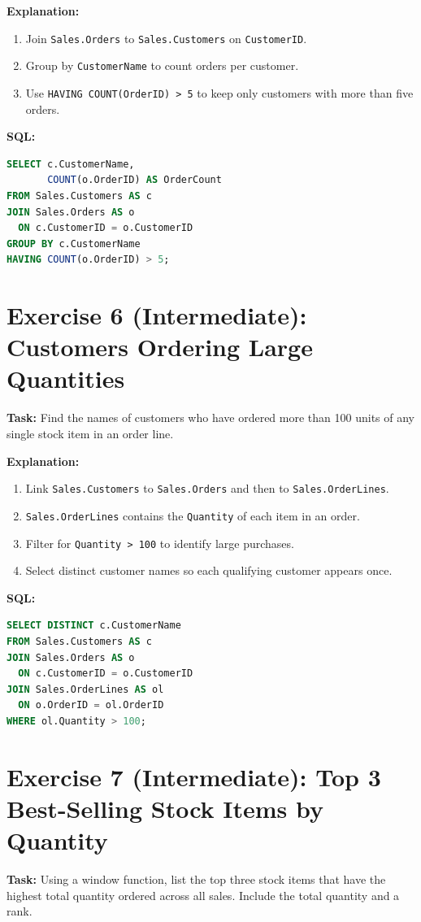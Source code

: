 \documentclass[12pt,a4paper]{article}
\begin{document}
\textbf{Explanation:}
\begin{enumerate}
  \item Join \texttt{Sales.Orders} to \texttt{Sales.Customers} on \texttt{CustomerID}.
  \item Group by \texttt{CustomerName} to count orders per customer.
  \item Use \texttt{HAVING COUNT(OrderID) > 5} to keep only customers with more than five orders.
\end{enumerate}

\textbf{SQL:}
\begin{lstlisting}[language=SQL]
SELECT c.CustomerName,
       COUNT(o.OrderID) AS OrderCount
FROM Sales.Customers AS c
JOIN Sales.Orders AS o
  ON c.CustomerID = o.CustomerID
GROUP BY c.CustomerName
HAVING COUNT(o.OrderID) > 5;
\end{lstlisting}

\section{Exercise 6 (Intermediate): Customers Ordering Large Quantities}
\textbf{Task:} Find the names of customers who have ordered more than 100 units of any single stock item in an order line.

\textbf{Explanation:}
\begin{enumerate}
  \item Link \texttt{Sales.Customers} to \texttt{Sales.Orders} and then to \texttt{Sales.OrderLines}.
  \item \texttt{Sales.OrderLines} contains the \texttt{Quantity} of each item in an order.
  \item Filter for \texttt{Quantity > 100} to identify large purchases.
  \item Select distinct customer names so each qualifying customer appears once.
\end{enumerate}

\textbf{SQL:}
\begin{lstlisting}[language=SQL]
SELECT DISTINCT c.CustomerName
FROM Sales.Customers AS c
JOIN Sales.Orders AS o
  ON c.CustomerID = o.CustomerID
JOIN Sales.OrderLines AS ol
  ON o.OrderID = ol.OrderID
WHERE ol.Quantity > 100;
\end{lstlisting}

\section{Exercise 7 (Intermediate): Top 3 Best-Selling Stock Items by Quantity}
\textbf{Task:} Using a window function, list the top three stock items that have the highest total quantity ordered across all sales. Include the total quantity and a rank.
\end{document}

